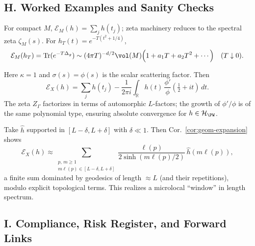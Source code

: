 
\subsection*{H. Worked Examples and Sanity Checks}
\label{subsec:examples-zeta-expanded}

\begin{example}
For compact $M$, $\mathcal E_M(h)=\sum_j h(t_j)$; zeta machinery reduces to the spectral zeta $\zeta_M(s)$. For $h_T(t)=e^{-T(t^2+1/4)}$,
\[
 \mathcal E_M(h_T)=\mathrm{Tr}(e^{-T\Delta_g})
 \sim (4\pi T)^{-d/2}\vol(M)\Big(1+a_1T+a_2T^2+\cdots\Big) \quad (T\downarrow 0).
\]
\end{example}

\begin{example}[Modular surface $X=\mathrm{PSL}_2(\mathbb Z)\backslash\mathbb H$]
Here $\kappa=1$ and $\sigma(s)=\phi(s)$ is the scalar scattering factor. Then
\[
 \mathcal E_X(h)=\sum_j h(t_j) - \frac{1}{2\pi i}
 \int_{\mathbb R} h(t)\,\frac{\phi'}{\phi}(\tfrac12+it)\,dt.
\]
The zeta $Z_\Gamma$ factorizes in terms of automorphic $L$-factors; the growth of $\phi'/\phi$ is of the same polynomial type, ensuring absolute convergence for $h\in\mathcal H_{\PW}$.
\end{example}

\begin{example}
Take $\hat h$ supported in $[L-\delta,L+\delta]$ with $\delta\ll 1$. Then Cor.~\ref{cor:geom-expansion} shows
\[
 \mathcal E_X(h)\approx \sum_{\substack{p,\,m\ge 1\\ m\ell(p)\in[L-\delta,L+\delta]}}
 \frac{\ell(p)}{2\sinh(m\ell(p)/2)}\,\hat h(m\ell(p)),
\]
a finite sum dominated by geodesics of length $\approx L$ (and their repetitions), modulo explicit topological terms. This realizes a microlocal ``window'' in length spectrum.
\end{example}


\subsection*{I. Compliance, Risk Register, and Forward Links}
\label{subsec:compliance-zeta-expanded}

